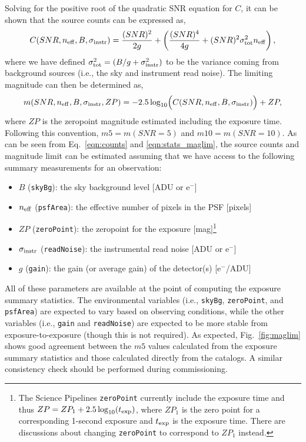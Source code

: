 \documentclass[DM,authoryear,toc]{lsstdoc}
\begin{document}
Solving for the positive root of the quadratic SNR equation for $C$, it can be shown that the source counts can be expressed as,
\begin{equation}
    \label{eqn:counts}
    C(SNR, n_{\rm eff}, B, \sigma_{\rm instr}) = \frac{(SNR)^2}{2g} + \left( \frac{(SNR)^4}{4g} + (SNR)^2 \sigma_{\rm tot}^2 n_{\rm eff}  \right),
\end{equation}
where we have defined $\sigma_{\rm tot}^2 = (B/g + \sigma_{\rm instr}^2)$ to be the variance coming from background sources (i.e., the sky and instrument read noise).
The limiting magnitude can then be determined as,
\begin{equation}
    \label{eqn:stats_maglim}
    m(SNR, n_{\rm eff}, B, \sigma_{\rm instr}, ZP) = -2.5 \log_{10} \Bigl( C(SNR, n_{\rm eff}, B, \sigma_{\rm instr}) \Bigr) + ZP,
\end{equation}
where $ZP$ is the zeropoint magnitude estimated including the exposure time. Following this convention, $m5 = m(SNR=5)$ and $m10 = m(SNR=10)$. As can be seen from Eq.~\ref{eqn:counts} and \ref{eqn:stats_maglim}, the source counts and magnitude limit can be estimated assuming that we have access to the following summary measurements for an observation:
\begin{itemize}[nosep,topsep=-10pt]
    \item $B$ (\texttt{skyBg}): the sky background level [ADU or e$^-$]
    \item $n_{\rm eff}$ (\texttt{psfArea}): the effective number of pixels in the PSF [pixels]
    \item $ZP$ (\texttt{zeroPoint}): the zeropoint for the exposure [mag]\footnote{The Science Pipelines \texttt{zeroPoint} currently include the exposure time and thus $ZP = ZP_{1} + 2.5\log_{10}(t_{\rm exp})$, where $ZP_{1}$ is the zero point for a corresponding 1-second exposure and $t_{\rm exp}$ is the exposure time. There are discussions about changing \texttt{zeroPoint} to correspond to $ZP_1$ instead.}
    \item $\sigma_{\rm instr}$ (\texttt{readNoise}): the instrumental read noise [ADU or e$^-$]
    \item $g$ (\texttt{gain}): the gain (or average gain) of the detector(s) [e$^-$/ADU]
\end{itemize}

All of these parameters are available at the point of computing the exposure summary statistics. The environmental variables (i.e., \texttt{skyBg}, \texttt{zeroPoint}, and \texttt{psfArea}) are expected to vary based on observing conditions, while the other variables (i.e., \texttt{gain} and \texttt{readNoise}) are expected to be more stable from exposure-to-exposure (though this is not required). As expected, Fig.~\ref{fig:maglim} shows good agreement between the $m5$ values calculated from the exposure summary statistics and those calculated directly from the catalogs. A similar consistency check should be performed during commissioning.
\end{document}
